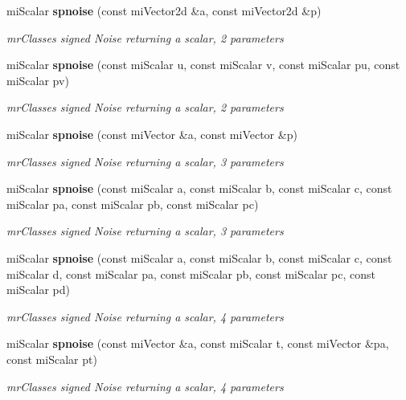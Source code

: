 \begin{CompactItemize}
mi\-Scalar {\bf spnoise} (const mi\-Vector2d \&a, const mi\-Vector2d \&p)
\begin{CompactList}\small\item\em mr\-Classes signed Noise returning a scalar, 2 parameters \item\end{CompactList}\item 
mi\-Scalar {\bf spnoise} (const mi\-Scalar u, const mi\-Scalar v, const mi\-Scalar pu, const mi\-Scalar pv)
\begin{CompactList}\small\item\em mr\-Classes signed Noise returning a scalar, 2 parameters \item\end{CompactList}\item 
mi\-Scalar {\bf spnoise} (const mi\-Vector \&a, const mi\-Vector \&p)
\begin{CompactList}\small\item\em mr\-Classes signed Noise returning a scalar, 3 parameters \item\end{CompactList}\item 
mi\-Scalar {\bf spnoise} (const mi\-Scalar a, const mi\-Scalar b, const mi\-Scalar c, const mi\-Scalar pa, const mi\-Scalar pb, const mi\-Scalar pc)
\begin{CompactList}\small\item\em mr\-Classes signed Noise returning a scalar, 3 parameters \item\end{CompactList}\item 
mi\-Scalar {\bf spnoise} (const mi\-Scalar a, const mi\-Scalar b, const mi\-Scalar c, const mi\-Scalar d, const mi\-Scalar pa, const mi\-Scalar pb, const mi\-Scalar pc, const mi\-Scalar pd)
\begin{CompactList}\small\item\em mr\-Classes signed Noise returning a scalar, 4 parameters \item\end{CompactList}\item 
mi\-Scalar {\bf spnoise} (const mi\-Vector \&a, const mi\-Scalar t, const mi\-Vector \&pa, const mi\-Scalar pt)
\begin{CompactList}\small\item\em mr\-Classes signed Noise returning a scalar, 4 parameters \item\end{CompactList}\item 

\end{CompactItemize}
